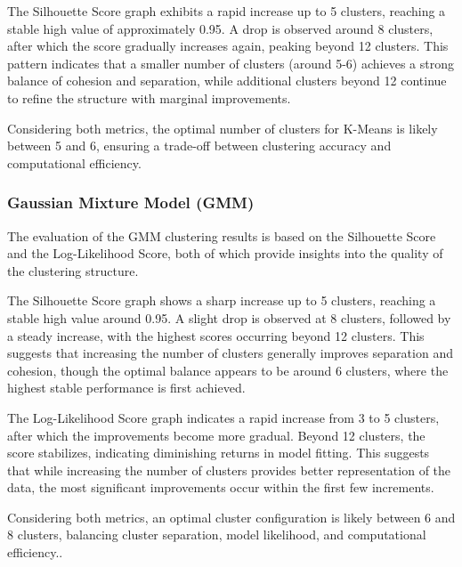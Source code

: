             The Silhouette Score graph exhibits a rapid increase up to 5 clusters, reaching a stable high value of approximately 0.95. A drop is observed around 8 clusters, after which the score gradually increases again, peaking beyond 12 clusters. This pattern indicates that a smaller number of clusters (around 5-6) achieves a strong balance of cohesion and separation, while additional clusters beyond 12 continue to refine the structure with marginal improvements.

            Considering both metrics, the optimal number of clusters for K-Means is likely between 5 and 6, ensuring a trade-off between clustering accuracy and computational efficiency.
        
        \subsubsection{Gaussian Mixture Model (GMM) \\}

            The evaluation of the GMM clustering results is based on the Silhouette Score and the Log-Likelihood Score, both of which provide insights into the quality of the clustering structure.

            The Silhouette Score graph shows a sharp increase up to 5 clusters, reaching a stable high value around 0.95. A slight drop is observed at 8 clusters, followed by a steady increase, with the highest scores occurring beyond 12 clusters. This suggests that increasing the number of clusters generally improves separation and cohesion, though the optimal balance appears to be around 6 clusters, where the highest stable performance is first achieved.

            The Log-Likelihood Score graph indicates a rapid increase from 3 to 5 clusters, after which the improvements become more gradual. Beyond 12 clusters, the score stabilizes, indicating diminishing returns in model fitting. This suggests that while increasing the number of clusters provides better representation of the data, the most significant improvements occur within the first few increments.

            Considering both metrics, an optimal cluster configuration is likely between 6 and 8 clusters, balancing cluster separation, model likelihood, and computational efficiency..
            
        
